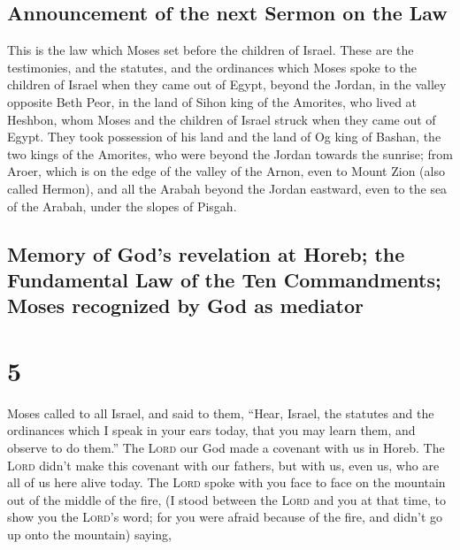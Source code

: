 \hypertarget{announcement-of-the-next-sermon-on-the-law}{%
\subsection{Announcement of the next Sermon on the
Law}\label{announcement-of-the-next-sermon-on-the-law}}

 This is the law which Moses set before the children of
Israel.  These are the testimonies, and the statutes, and
the ordinances which Moses spoke to the children of Israel when they
came out of Egypt,  beyond the Jordan, in the valley
opposite Beth Peor, in the land of Sihon king of the Amorites, who lived
at Heshbon, whom Moses and the children of Israel struck when they came
out of Egypt.  They took possession of his land and the
land of Og king of Bashan, the two kings of the Amorites, who were
beyond the Jordan towards the sunrise;  from Aroer, which
is on the edge of the valley of the Arnon, even to Mount Zion (also
called Hermon),  and all the Arabah beyond the Jordan
eastward, even to the sea of the Arabah, under the slopes of Pisgah.

\hypertarget{memory-of-gods-revelation-at-horeb-the-fundamental-law-of-the-ten-commandments-moses-recognized-by-god-as-mediator}{%
\subsection{Memory of God's revelation at Horeb; the Fundamental Law of
the Ten Commandments; Moses recognized by God as
mediator}\label{memory-of-gods-revelation-at-horeb-the-fundamental-law-of-the-ten-commandments-moses-recognized-by-god-as-mediator}}

\hypertarget{section-4}{%
\section{5}\label{section-4}}

 Moses called to all Israel, and said to them, ``Hear,
Israel, the statutes and the ordinances which I speak in your ears
today, that you may learn them, and observe to do them.'' 
The \textsc{Lord} our God made a covenant with us in Horeb.
 The \textsc{Lord} didn't make this covenant with our
fathers, but with us, even us, who are all of us here alive today.
 The \textsc{Lord} spoke with you face to face on the
mountain out of the middle of the fire,  (I stood between
the \textsc{Lord} and you at that time, to show you the \textsc{Lord}'s
word; for you were afraid because of the fire, and didn't go up onto the
mountain) saying,

